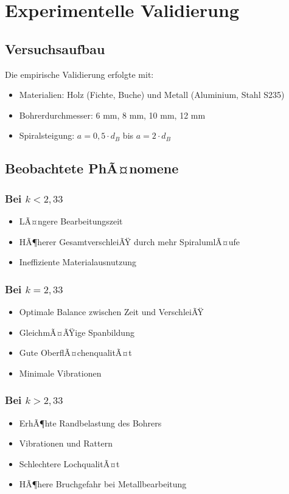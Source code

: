 ﻿\documentclass[12pt,a4paper]{article}
\begin{document}
\section{Experimentelle Validierung}

\subsection{Versuchsaufbau}

Die empirische Validierung erfolgte mit:
\begin{itemize}
	\item Materialien: Holz (Fichte, Buche) und Metall (Aluminium, Stahl S235)
	\item Bohrerdurchmesser: 6 mm, 8 mm, 10 mm, 12 mm
	\item Spiralsteigung: $a = 0{,}5 \cdot d_B$ bis $a = 2 \cdot d_B$
\end{itemize}

\subsection{Beobachtete PhÃ¤nomene}

\subsubsection{Bei $k < 2{,}33$}
\begin{itemize}
	\item LÃ¤ngere Bearbeitungszeit
	\item HÃ¶herer GesamtverschleiÃŸ durch mehr SpiralumlÃ¤ufe
	\item Ineffiziente Materialausnutzung
\end{itemize}

\subsubsection{Bei $k = 2{,}33$}
\begin{itemize}
	\item Optimale Balance zwischen Zeit und VerschleiÃŸ
	\item GleichmÃ¤ÃŸige Spanbildung
	\item Gute OberflÃ¤chenqualitÃ¤t
	\item Minimale Vibrationen
\end{itemize}

\subsubsection{Bei $k > 2{,}33$}
\begin{itemize}
	\item ErhÃ¶hte Randbelastung des Bohrers
	\item Vibrationen und Rattern
	\item Schlechtere LochqualitÃ¤t
	\item HÃ¶here Bruchgefahr bei Metallbearbeitung
\end{itemize}
\end{document}
